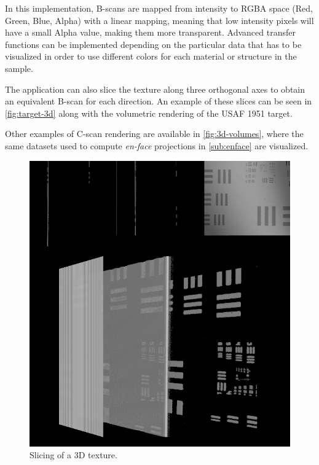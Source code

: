 In this implementation, B-scans are mapped from intensity to RGBA space (Red, Green, Blue, Alpha) with a linear mapping, meaning that low intensity pixels will have a small Alpha value, making them more transparent. Advanced transfer functions can be implemented depending on the particular data that has to be visualized in order to use different colors for each material or structure in the sample. 

The application can also slice the texture along three orthogonal axes to obtain an equivalent B-scan for each direction. An example of these slices can be seen in \autoref{fig:target-3d} along with the volumetric rendering of the USAF 1951 target. 

Other examples of C-scan rendering are available in \autoref{fig:3d-volumes}, where the same datasets used to compute \emph{en-face} projections in \autoref{sub:enface} are visualized. 

	\begin{figure}[hbt]
		\centering
		\includegraphics[width=0.92\linewidth,height=0.8\linewidth]{gfx/3d/target}
		\caption[]{Slicing of a 3D texture.}\label{fig:target-3d}
	\end{figure}
%
%
%
%
%
%

